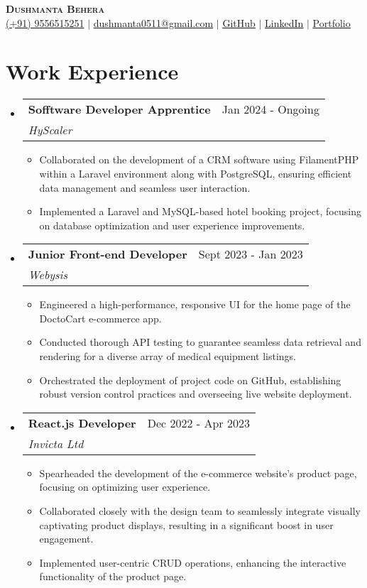 \documentclass[letterpaper, 11pt]{article}
\makeatletter
\newcommand{\resumeItem}[1]{ \item\small{ {#1 \vspace{-2pt}} } }
\newcommand{\resumeSubheading}[4]{
\vspace{-2pt}
\item
\begin{tabular*}{0.97\textwidth}[t]{l@{\extracolsep{\fill}}r}
	\textbf{#1}       & #2                 \\
	\textit{\small#3} & \textit{\small #4} \\
\end{tabular*}
\vspace{-7pt}
}
\newcommand{\resumeSubHeadingListStart}{\begin{itemize}[leftmargin=0.15in, label={}]}
\newcommand{\resumeSubHeadingListEnd}{\end{itemize}}
\newcommand{\resumeItemListStart}{\begin{itemize}}
\newcommand{\resumeItemListEnd}{\end{itemize}
\vspace{-5pt}}
\makeatother
\begin{document}

	\begin{center}
		\textbf{\Huge \scshape Dushmanta Behera} \\
		\vspace{1pt}
		\small \raisebox{-0.05\height}{\faPhone*}
		\href{tel:+919556515251}{{(+91) 9556515251}} $|$
		\raisebox{-0.05\height}{\faEnvelope}
		\href{mailto:dushmanta0511@gmail.com}{{dushmanta0511@gmail.com}} $|$
		\raisebox{-0.05\height}{\faGithub}
		\href{https://github.com/dushmanta05}{{\underline{GitHub}}} $|$
		\raisebox{-0.05\height}{\faLinkedin}
		\href{https://www.linkedin.com/in/dushmanta05/}{{\underline{LinkedIn}}} $|$
		\raisebox{-0.05\height}{\faGlobe}
		\href{https://dushmanta.dev/}{{\underline{Portfolio}}}
	\end{center}

	\section{Work Experience}
	\resumeSubHeadingListStart
	\resumeSubheading {Sofftware Developer Apprentice}{Jan 2024 - Ongoing}
	{HyScaler}{} \resumeItemListStart \resumeItem{Collaborated on the development of a CRM software using FilamentPHP within a Laravel environment along with PostgreSQL, ensuring efficient data management and seamless user interaction.}
	\resumeItem{Implemented a Laravel and MySQL-based hotel booking project, focusing on database optimization and user experience improvements.}
	\resumeItemListEnd \resumeSubheading {Junior Front-end Developer}{Sept 2023 - Jan 2023}
	{Webysis}{} \resumeItemListStart \resumeItem{Engineered a high-performance, responsive UI for the home page of the DoctoCart e-commerce app.}
	\resumeItem{Conducted thorough API testing to guarantee seamless data retrieval and rendering for a diverse array of medical equipment listings.}
	\resumeItem{Orchestrated the deployment of project code on GitHub, establishing robust version control practices and overseeing live website deployment.}
	\resumeItemListEnd \resumeSubheading {React.js Developer}{Dec 2022 - Apr 2023}
	{Invicta Ltd}{} \resumeItemListStart \resumeItem{Spearheaded the development of the e-commerce website's product page, focusing on optimizing user experience.}
	\resumeItem{Collaborated closely with the design team to seamlessly integrate visually captivating product displays, resulting in a significant boost in user engagement.}
	\resumeItem{Implemented user-centric CRUD operations, enhancing the interactive functionality of the product page.}
	\resumeItemListEnd \resumeSubHeadingListEnd
\end{document}
